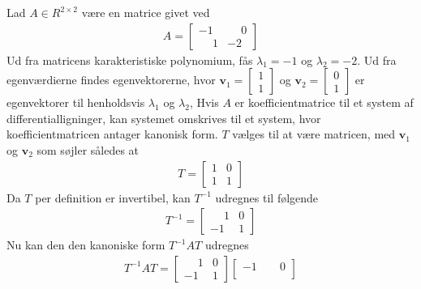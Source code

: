 \begin{eks}
    Lad $A\in R^{2\times 2}$ være en matrice givet ved
%    
    \begin{align*}
        A = \begin{bmatrix}
                -1 & \phantom{-}0\\
                \phantom{-}1 & -2
        \end{bmatrix}
    \end{align*}
%
    Ud fra matricens karakteristiske polynomium, fås $\lambda_1 = -1$ og $\lambda_2 = -2$. 
    Ud fra egenværdierne findes egenvektorerne, hvor 
    $\textbf{v}_1 = \begin{bmatrix}
        1\\1
    \end{bmatrix}$ og
    $\textbf{v}_2 = \begin{bmatrix}
        0\\1
    \end{bmatrix}$ er egenvektorer til henholdsvis $\lambda_1$ og $\lambda_2$,
%
    Hvis $A$ er koefficientmatrice til et system af differentialligninger, kan systemet omskrives til et system, hvor koefficientmatricen antager kanonisk form. $T$ vælges til at være matricen, med $\textbf{v}_1$ og $\textbf{v}_2$ som søjler således at
%    
    \begin{align*}
        T = \begin{bmatrix}
                1 & 0\\
                1 & 1
            \end{bmatrix}
    \end{align*}    
%
    Da $T$ per definition er invertibel, kan $T^{-1}$ udregnes til følgende
%    
    \begin{align*}
      T^{-1} = \begin{bmatrix}
                    \phantom{-}1 & 0\\
                    -1 & 1
                \end{bmatrix}
    \end{align*}    
%   
    Nu kan den den kanoniske form $T^{-1}AT$ udregnes
%
    \begin{align*}
        T^{-1}AT =
            \begin{bmatrix}
                \phantom{-}1 & 0\\
                    -1 & 1
            \end{bmatrix}
            \begin{bmatrix}
                -1 & \phantom{-}0\\

\end{bmatrix}
\end{align*}
\end{eks}

